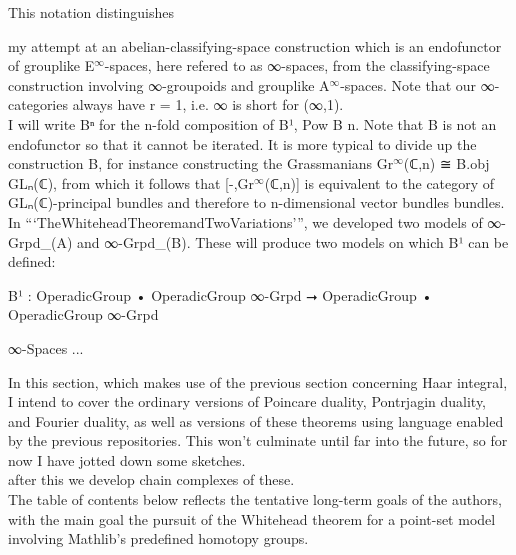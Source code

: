 \documentclass{book}
\theoremstyle{definition}
\begin{document}
This notation distinguishes 


my attempt at an abelian-classifying-space construction which is an endofunctor of grouplike E${}^{\infty}$-spaces, here refered to as ∞-spaces, from the classifying-space construction involving ∞-groupoids and grouplike A${}^{\infty}$-spaces. Note that our ∞-categories always have r = 1, i.e. ∞ is short for (∞,1).\\

I will write Bⁿ for the n-fold composition of B¹, Pow B n. Note that B is not an endofunctor so that it cannot be iterated. It is more typical to divide up the construction B, for instance constructing the Grassmanians Gr${}^{\infty}$(ℂ,n) ≅ B.obj GLₙ(ℂ), from which it follows that [-,Gr${}^{\infty}$(ℂ,n)] is equivalent to the category of GLₙ(ℂ)-principal bundles and therefore to n-dimensional vector bundles bundles.\\

In ```TheWhiteheadTheoremandTwoVariations''', we developed two models of ∞-Grpd\_(A) and ∞-Grpd\_(B). These will produce two models on which B¹ can be defined:

\begin{center}
B¹ : OperadicGroup • OperadicGroup ∞-Grpd ⭢ OperadicGroup • OperadicGroup ∞-Grpd
\end{center}

∞-Spaces ...


In this section, which makes use of the previous section concerning Haar integral, I intend to cover the ordinary versions of Poincare duality, Pontrjagin duality, and Fourier duality, as well as versions of these theorems using language enabled by the previous repositories. This won't culminate until far into the future, so for now I have jotted down some sketches.\\

after this we develop chain complexes of these.\\

The table of contents below reflects the tentative long-term goals of the authors, with the main goal the pursuit of the Whitehead theorem for a point-set model involving Mathlib's predefined homotopy groups.\\
\end{document}
